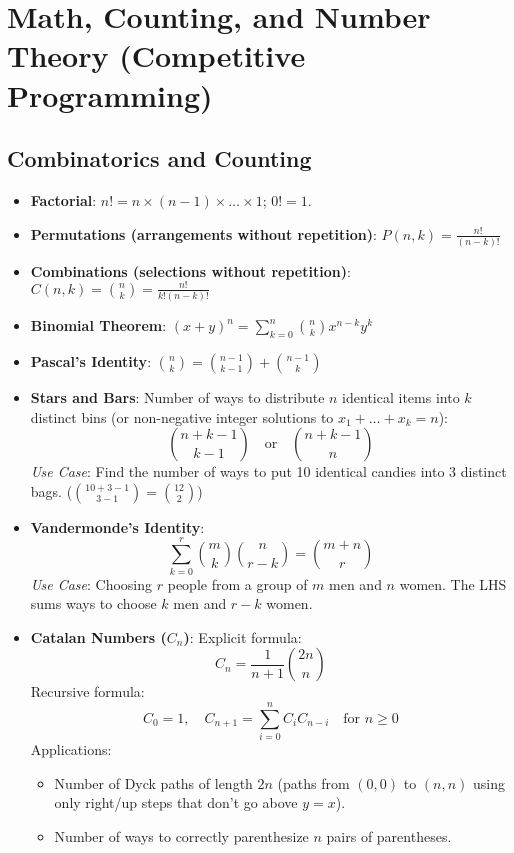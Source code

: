 \section*{Math, Counting, and Number Theory (Competitive Programming)}
\subsection*{Combinatorics and Counting}
\begin{itemize}
    \item \textbf{Factorial}: $n! = n \times (n-1) \times \dots \times 1$; $0! = 1$.
    \item \textbf{Permutations (arrangements without repetition)}: $P(n, k) = \frac{n!}{(n-k)!}$
    \item \textbf{Combinations (selections without repetition)}: $C(n, k) = \binom{n}{k} = \frac{n!}{k!(n-k)!}$
    \item \textbf{Binomial Theorem}: $(x+y)^n = \sum_{k=0}^n \binom{n}{k} x^{n-k} y^k$
    \item \textbf{Pascal's Identity}: $\binom{n}{k} = \binom{n-1}{k-1} + \binom{n-1}{k}$
    \item \textbf{Stars and Bars}:
        Number of ways to distribute $n$ identical items into $k$ distinct bins (or non-negative integer solutions to $x_1 + \dots + x_k = n$):
        \[
        \binom{n + k - 1}{k - 1} \quad \text{or} \quad \binom{n + k - 1}{n}
        \]
        \textit{Use Case}: Find the number of ways to put 10 identical candies into 3 distinct bags. ($\binom{10+3-1}{3-1} = \binom{12}{2}$)
    \item \textbf{Vandermonde's Identity}:
        \[
        \sum_{k=0}^r \binom{m}{k} \binom{n}{r - k} = \binom{m + n}{r}
        \]
        \textit{Use Case}: Choosing $r$ people from a group of $m$ men and $n$ women. The LHS sums ways to choose $k$ men and $r-k$ women.
    \item \textbf{Catalan Numbers ($C_n$)}:
        Explicit formula:
        \[
        C_n = \frac{1}{n + 1} \binom{2n}{n}
        \]
        Recursive formula:
        \[
        C_0 = 1, \quad C_{n+1} = \sum_{i=0}^n C_i C_{n-i} \quad \text{for } n \ge 0
        \]
        Applications:
        \begin{itemize}
            \item Number of Dyck paths of length $2n$ (paths from $(0,0)$ to $(n,n)$ using only right/up steps that don't go above $y=x$).
            \item Number of ways to correctly parenthesize $n$ pairs of parentheses.

\end{itemize}
\end{itemize}
